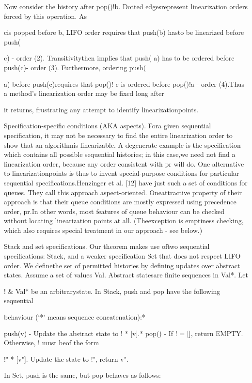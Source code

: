 Now consider the history after pop()!b. Dotted edgesrepresent linearization orders forced by this operation. As

cis popped before
b, LIFO order requires that push(b) hasto be linearized before push(

c) - order (2). Transitivitythen implies that push(
a) has to be ordered before push(c)- order (3). Furthermore, ordering push(

a) before push(c)requires that pop()!
c is ordered before pop()!a - order (4).Thus a method's linearization order may be fixed long after

it returns, frustrating any attempt to identify linearizationpoints.

Specification-specific conditions (AKA aspects). Fora given sequential specification, it may not be necessary to
find the entire linearization order to show that an algorithmis linearizable. A degenerate example is the specification
which contains all possible sequential histories; in this case,we need not find a linearization order, because any order
consistent with pr will do. One alternative to linearizationpoints is thus to invent special-purpose conditions for particular sequential specifications.Henzinger et al. [12] have just such a set of conditions
for queues. They call this approach aspect-oriented. Oneattractive property of their approach is that their queue
conditions are mostly expressed using precedence order, pr.In other words, most features of queue behaviour can be
checked without locating linearization points at all. (Theexception is emptiness checking, which also requires special
treatment in our approach - see below.)

Stack and set specifications. Our theorem makes use oftwo sequential specifications: Stack, and a weaker specification Set that does not respect LIFO order. We definethe set of permitted histories by defining updates over abstract states. Assume a set of values Val. Abstract statesare finite sequences in Val*. Let

! & Val* be an arbitrarystate. In Stack, push and pop have the following sequential

behaviour (`*' means sequence concatenation):*

push(v) - Update the abstract state to ! * [v].*
pop() - If ! = [], return EMPTY. Otherwise, ! must beof the form

!" * [v"]. Update the state to !", return v".

In Set, push is the same, but pop behaves as follows:


